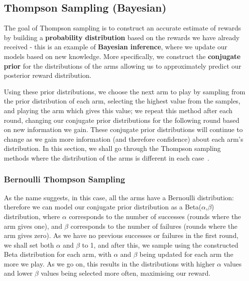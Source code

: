 \subsection{Thompson Sampling (Bayesian)}\label{subsec:thompson-sampling-(bayesian)}
The goal of Thompson sampling is to construct an accurate estimate of rewards by building a \textbf{probability distribution} based on the rewards we have already received - this is an example of \textbf{Bayesian inference}, where we update our models based on new knowledge.
More specifically, we construct the \textbf{conjugate prior} for the distributions of the arms allowing us to approximately predict our posterior reward distribution.
\par
Using these prior distributions, we choose the next arm to play by sampling from the prior distribution of each arm, selecting the highest value from the samples, and playing the arm which gives this value;
we repeat this method after each round, changing our conjugate prior distributions for the following round based on new information we gain.
These conjugate prior distributions will continue to change as we gain more information (and therefore confidence) about each arm's distribution.
In this section, we shall go through the Thompson sampling methods where the distribution of the arms is different in each case~\citep{agrawal2012analysis}.

\subsubsection{Bernoulli Thompson Sampling}
As the name suggests, in this case, all the arms have a Bernoulli distribution: therefore we can model our conjugate prior distribution as a Beta($\alpha$,$\beta$) distribution, where $\alpha$ corresponds to the number of successes (rounds where the arm gives one), and $\beta$ corresponds to the number of failures (rounds where the arm gives zero).
As we have no previous successes or failures in the first round, we shall set both $\alpha$ and $\beta$ to 1, and after this, we sample using the constructed Beta distribution for each arm, with $\alpha$ and $\beta$ being updated for each arm the more we play.
As we go on, this results in the distributions with higher $\alpha$ values and lower $\beta$ values being selected more often, maximising our reward.

